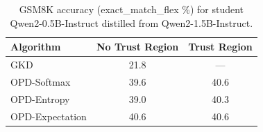 \begin{table}[h]
\centering
\caption{GSM8K accuracy (exact\_match\_flex \%) for student Qwen2-0.5B-Instruct
         distilled from Qwen2-1.5B-Instruct.}
\label{tab:gsm8k_results}
\begin{tabular}{lcc}
\toprule
\textbf{Algorithm} & \textbf{No Trust Region} & \textbf{Trust Region} \\
\midrule
GKD & 21.8 & --- \\
OPD-Softmax & 39.6 & 40.6 \\
OPD-Entropy & 39.0 & 40.3 \\
OPD-Expectation & 40.6 & 40.6 \\
\bottomrule
\end{tabular}
\end{table}
